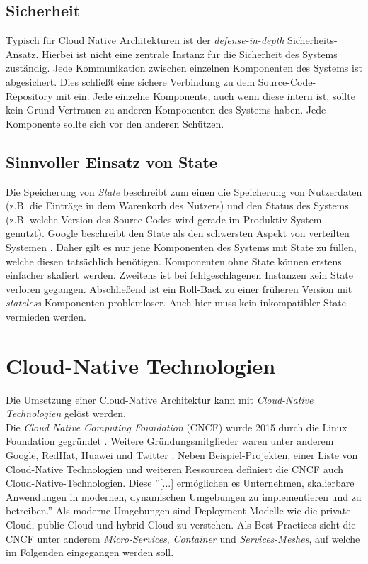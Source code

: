 \subsection{Sicherheit}
Typisch für Cloud Native Architekturen ist der \textit{defense-in-depth} Sicherheits-Ansatz. Hierbei ist nicht eine zentrale Instanz für die Sicherheit des Systems zuständig. Jede Kommunikation zwischen einzelnen Komponenten des Systems ist abgesichert. Dies schließt eine sichere Verbindung zu dem Source-Code-Repository mit ein. Jede einzelne Komponente, auch wenn diese intern ist, sollte kein Grund-Vertrauen zu anderen Komponenten des Systems haben. Jede Komponente sollte sich vor den anderen Schützen.
\subsection{Sinnvoller Einsatz von State}
Die Speicherung von \textit{State} beschreibt zum einen die Speicherung von Nutzerdaten (z.B. die Einträge in dem Warenkorb des Nutzers) und den Status des Systems (z.B. welche Version des Source-Codes wird gerade im Produktiv-System genutzt). Google beschreibt den State als den schwersten Aspekt von verteilten Systemen \cite{tom_grey_5_nodate}. Daher gilt es nur jene Komponenten des Systems mit State zu füllen, welche diesen tatsächlich benötigen. Komponenten ohne State können erstens einfacher skaliert werden. Zweitens ist bei fehlgeschlagenen Instanzen kein State verloren gegangen. Abschließend ist ein Roll-Back zu einer früheren Version mit \textit{stateless} Komponenten problemloser. Auch hier muss kein inkompatibler State vermieden werden. 

\section{Cloud-Native Technologien}
Die Umsetzung einer Cloud-Native Architektur kann mit \textit{Cloud-Native Technologien} gelöst werden.\\
Die \textit{Cloud Native Computing Foundation} (CNCF) wurde 2015 durch die Linux Foundation gegründet \cite{cncf_new_2015}. Weitere Gründungsmitglieder waren unter anderem Google, RedHat, Huawei und Twitter \cite{}. Neben Beispiel-Projekten, einer Liste von Cloud-Native Technologien und weiteren Ressourcen definiert die CNCF auch Cloud-Native-Technologien. Diese ''[...] ermöglichen es Unternehmen, skalierbare Anwendungen in modernen, dynamischen Umgebungen zu implementieren und zu betreiben.''\cite{cloud_native_computing_foundation_cncftoc_nodate} Als moderne Umgebungen sind Deployment-Modelle wie die private Cloud, public Cloud und hybrid Cloud zu verstehen. Als Best-Practices sieht die CNCF unter anderem \textit{Micro-Services}, \textit{Container} und \textit{Services-Meshes}, auf welche im Folgenden eingegangen werden soll.

